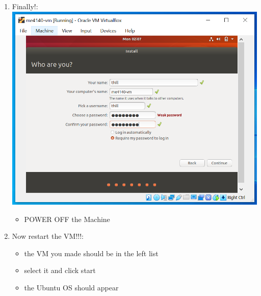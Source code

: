 \documentclass[12pt]{article}
\begin{document}
\begin{description}
\begin{enumerate}
\begin{itemize}
            \end{itemize}
	\newpage
\item Finally!: \vspace{20mm} \\
      		\includegraphics[scale=.6]{Capture19.png}
            \begin{itemize}
        \item POWER OFF the Machine
    \end{itemize} 
	\newpage
\item Now restart the VM!!!:
    \begin{itemize}
        \item the VM you made should be in the left list
        \item select it and click start
		\item the Ubuntu OS should appear	
    \end{itemize}        


\end{enumerate}
\end{description}
\end{document}
